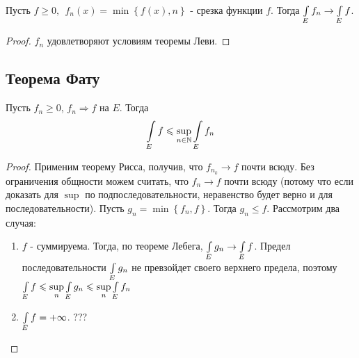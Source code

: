 \begin{corollary}
	Пусть $f \geqslant 0,  \:\: f_n(x) = \min\left\{f(x), n\right\}$ - срезка функции $f$. Тогда $\int\limits_{E} f_n \rightarrow \int\limits_{E} f$.
\end{corollary}

\begin{proof}
	$f_n$ удовлетворяют условиям теоремы Леви.
\end{proof}

\subsection{Теорема Фату}

\begin{theorem}
	Пусть $f_n \geqslant 0$, $f_n \Rightarrow f$ на $E$. Тогда \[\int\limits_{E} f \leqslant \sup\limits_{n \in \mathbb{N}} \int\limits_{E} f_n	\]
\end{theorem}

\begin{proof}
	Применим теорему Рисса, получив, что $f_{n_k} \rightarrow f$ почти всюду. Без ограничения общности можем считать, что $f_n \rightarrow f$ почти всюду
	(потому что если доказать для $\sup$ по подпоследовательности, неравенство будет верно и для последовательности).
	Пусть $g_n = \min\left\{f_n, f\right\}$. Тогда $g_n \leqslant f$.
	Рассмотрим два случая:
	\begin{enumerate}
		\item 
			$f$ - суммируема.
			Тогда, по теореме Лебега, $\int\limits_{E} g_n \rightarrow \int\limits_{E} f$. Предел последовательности $\int\limits_{E} g_n$ не превзойдет своего верхнего предела, 
			поэтому $\int\limits_{E} f \leqslant \sup\limits_{n} \int\limits_{E} g_n \leqslant \sup\limits_{n}\int\limits_{E} f_n$
		\item
			$\int\limits_{E} f = +\infty$. ??? 
	\end{enumerate}
\end{proof}

\newpage
